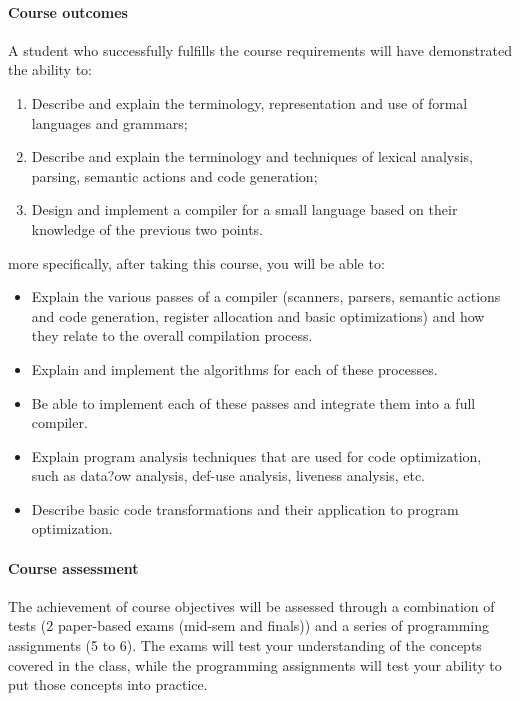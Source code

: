 \documentclass{article}
\begin{document}
\paragraph{Course outcomes} A student who successfully fulfills the course requirements will have demonstrated the ability to:
\begin{enumerate}
	\item Describe and explain the terminology, representation and use of formal languages and grammars; 
	\item Describe and explain the terminology and techniques of lexical analysis, parsing, semantic actions and code generation; 
	\item Design and implement a compiler for a small language based on their knowledge of the previous two points. 
\end{enumerate}

more specifically, after taking this course, you will be able to:
\begin{itemize}
	\item Explain the various passes of a compiler (scanners, parsers, semantic actions and code generation, register allocation and basic optimizations) and how they relate to the overall compilation process. 
	\item Explain and implement the algorithms for each of these processes.
	\item Be able to implement each of these passes and integrate them into a full compiler. 
	\item Explain program analysis techniques that are used for code optimization, such as data?ow analysis, def-use analysis, liveness analysis, etc. 
	\item Describe basic code transformations and their application to program optimization. 
\end{itemize}

\paragraph{Course assessment} The achievement of course objectives will be assessed through a combination of tests (2 paper-based exams (mid-sem and finals)) and a series of programming assignments (5 to 6). 
The exams will test your understanding of the concepts covered in the class, while the programming assignments will test your ability to put those concepts into practice.
\end{document}
